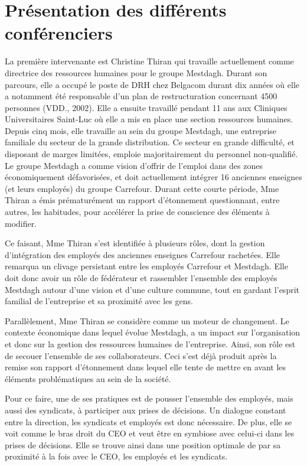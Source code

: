 \section{Présentation des différents conférenciers}
La première intervenante est Christine Thiran qui travaille actuellement comme directrice des ressources humaines pour le groupe Mestdagh. Durant son parcours, elle a occupé le poste de DRH chez Belgacom durant dix années où elle a notamment été responsable d'un plan de restructuration concernant 4500 personnes (VDD., 2002).
Elle a ensuite travaillé pendant 11 ans aux Cliniques Universitaires Saint-Luc où elle a mis en place une section ressources humaines.
Depuis cinq mois, elle travaille au sein du groupe Mestdagh, une entreprise familiale du secteur de la grande distribution. Ce secteur en grande difficulté, et disposant de marges limitées, emploie majoritairement du personnel non-qualifié. Le groupe Mestdagh a comme vision d'offrir de l'emploi dans des zones économiquement défavorisées, et doit actuellement intégrer 16 anciennes enseignes (et leurs employés) du groupe Carrefour.
Durant cette courte période, Mme Thiran a émis prématurément un rapport d'étonnement questionnant, entre autres, les habitudes, pour accélérer la prise de conscience des éléments à modifier. \newline

Ce faisant, Mme Thiran s'est identifiée à plusieurs rôles, dont la gestion d'intégration des employés des anciennes enseignes Carrefour rachetées. Elle remarqua un clivage persistant entre les employés Carrefour et Mestdagh. Elle doit donc avoir un rôle de fédérateur et rassembler l'ensemble des employés Mestdagh autour d'une vision et d'une culture commune, tout en gardant l'esprit familial de l'entreprise et sa proximité avec les gens.\newline

Parallèlement, Mme Thiran se considère comme un moteur de changement. Le contexte économique dans lequel évolue Mestdagh, a un impact sur l'organisation et donc sur la gestion des ressources humaines de l'entreprise. Ainsi, son rôle est de \og{}secouer\fg{} l'ensemble de ses collaborateurs. Ceci s'est déjà produit après la remise son rapport d'étonnement dans lequel elle tente de mettre en avant les éléments problématiques au sein de la société.\newline

Pour ce faire, une de ses pratiques est de pousser l'ensemble des employés, mais aussi des syndicats, à participer aux prises de décisions. Un dialogue constant entre la direction, les syndicats et employés est donc nécessaire. De plus, elle se voit comme le bras droit du CEO et veut être en symbiose avec celui-ci dans les prises de décisions. Elle se trouve ainsi dans une position optimale de par sa proximité à la fois avec le CEO, les employés et les syndicats.\newline

